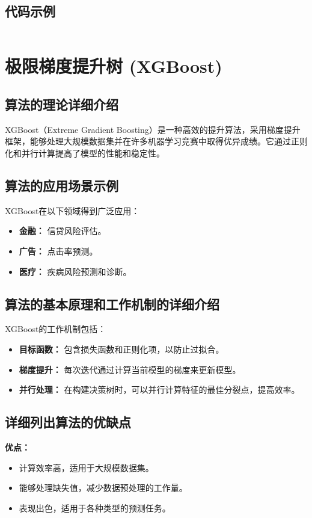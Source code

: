 \subsection*{代码示例}
\begin{lstlisting}

\end{lstlisting}


\section{极限梯度提升树 (XGBoost)}
\subsection*{算法的理论详细介绍}
XGBoost（Extreme Gradient Boosting）是一种高效的提升算法，采用梯度提升框架，能够处理大规模数据集并在许多机器学习竞赛中取得优异成绩。它通过正则化和并行计算提高了模型的性能和稳定性。

\subsection*{算法的应用场景示例}
XGBoost在以下领域得到广泛应用：
\begin{itemize}
    \item \textbf{金融：} 信贷风险评估。
    \item \textbf{广告：} 点击率预测。
    \item \textbf{医疗：} 疾病风险预测和诊断。
\end{itemize}

\subsection*{算法的基本原理和工作机制的详细介绍}
XGBoost的工作机制包括：
\begin{itemize}
    \item \textbf{目标函数：} 包含损失函数和正则化项，以防止过拟合。
    \item \textbf{梯度提升：} 每次迭代通过计算当前模型的梯度来更新模型。
    \item \textbf{并行处理：} 在构建决策树时，可以并行计算特征的最佳分裂点，提高效率。
\end{itemize}

\subsection*{详细列出算法的优缺点}
\textbf{优点：}
\begin{itemize}
    \item 计算效率高，适用于大规模数据集。
    \item 能够处理缺失值，减少数据预处理的工作量。
    \item 表现出色，适用于各种类型的预测任务。
\end{itemize}

